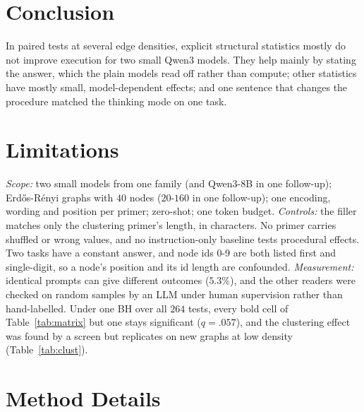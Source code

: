 \documentclass[11pt]{article}
\begin{document}
\section{Conclusion}
\label{sec:conclusion}
In paired tests at several edge densities, explicit structural statistics mostly do not improve execution for two small Qwen3 models. They help mainly by stating the answer, which the plain models read off rather than compute; other statistics have mostly small, model-dependent effects; and one sentence that changes the procedure matched the thinking mode on one task.

\section*{Limitations}
\emph{Scope:} two small models from one family (and Qwen3-8B in one follow-up); Erd\H{o}s-R\'enyi graphs with $40$ nodes ($20$-$160$ in one follow-up); one encoding, wording and position per primer; zero-shot; one token budget. \emph{Controls:} the filler matches only the clustering primer's length, in characters. No primer carries shuffled or wrong values, and no instruction-only baseline tests procedural effects. Two tasks have a constant answer, and node ids 0-9 are both listed first and single-digit, so a node's position and its id length are confounded. \emph{Measurement:} identical prompts can give different outcomes ($5.3\%$), and the other readers were checked on random samples by an LLM under human supervision rather than hand-labelled. Under one BH over all $264$ tests, every bold cell of Table~\ref{tab:matrix} but one stays significant ($q=.057$), and the clustering effect was found by a screen but replicates on new graphs at low density (Table~\ref{tab:clust}). %

\clearpage


\clearpage
\appendix
\makeatletter
\setlength{\@fptop}{0pt}\setlength{\@fpsep}{\floatsep}
\setlength{\@dblfptop}{0pt}\setlength{\@dblfpsep}{\dblfloatsep}
\makeatother
\setlength{\textfloatsep}{10pt plus 2pt minus 2pt}
\setlength{\dbltextfloatsep}{10pt plus 2pt minus 2pt}
\setlength{\intextsep}{8pt plus 2pt minus 2pt}
\renewcommand{\topfraction}{0.9}\renewcommand{\dbltopfraction}{0.9}\renewcommand{\textfraction}{0.1}\setcounter{topnumber}{3}\setcounter{dbltopnumber}{2}
\section{Method Details}
\label{app:audit}
\end{document}
